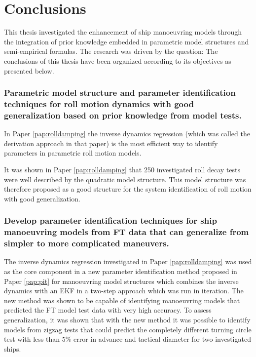 \chapter{Conclusions\label{ch:conclusions}}

\noindent This thesis investigated the enhancement of ship manoeuvring models through the integration of prior knowledge embedded in parametric model structures and semi-empirical formulas. The research was driven by the question:
\say{\researchquestion}
The conclusions of this thesis have been organized according to its objectives as presented below.

\subsection*{Parametric model structure and parameter identification techniques for roll motion dynamics with good generalization based on prior knowledge from model tests.}
In Paper \ref{pap:rolldamping}  the inverse dynamics regression (which was called the derivation approach in that paper) is the most efficient way to identify parameters in parametric roll motion models. 

It was shown in Paper \ref{pap:rolldamping} that 250 investigated roll decay tests were well described by the quadratic model structure. This model structure was therefore proposed as a good structure for the system identification of roll motion with good generalization.  

\subsection*{Develop parameter identification techniques for ship manoeuvring models from FT data that can generalize from simpler to more complicated maneuvers.}
The inverse dynamics regression investigated in Paper \ref{pap:rolldamping} was used as the core component in a new parameter identification method proposed in Paper \ref{pap:pit} for manoeuvring model structures which combines the inverse dynamics with an EKF in a two-step approach \cite{yoonIdentificationHydrodynamicCoefficients2003} which was run in iteration.
The new method was shown to be capable of identifying manoeuvring models that predicted the FT model test data with very high accuracy.
To assess generalization, it was shown that with the new method it was possible to identify models from zigzag tests that could predict the completely different turning circle test with less than 5\% error in advance and tactical diameter for two investigated ships.

